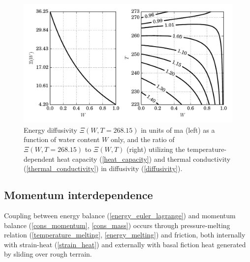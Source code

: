 \begin{figure}
  \centering
    \includegraphics[width=\linewidth]{images/internal_energy/kappa.pdf}
  \caption[Energy diffusivity diagram]{Energy diffusivity $\Xi(W, T=268.15)$ in units of ma (left) as a function of water content $W$ only, and the ratio of $\Xi(W,T=268.15)$ to $\Xi(W,T)$ (right) utilizing the temperature-dependent heat capacity (\ref{heat_capacity}) and thermal conductivity (\ref{thermal_conductivity}) in diffusivity (\ref{diffusivity}).}
  \label{bulk_thermal_image}
\end{figure}


\subsection{Momentum interdependence}

Coupling between energy balance (\ref{energy_euler_lagrange}) and momentum balance (\ref{cons_momentum}, \ref{cons_mass}) occurs through pressure-melting relation (\ref{temperature_melting}, \ref{energy_melting}) and friction, both internally with strain-heat (\ref{strain_heat}) and externally with basal fiction heat generated by sliding over rough terrain.

